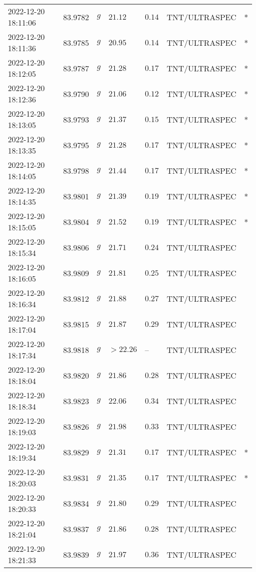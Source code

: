 \documentclass{nature_plusfigure}
\begin{document}
\begin{supplement}
\begin{center}
\begin{longtable}{lllllll}
2022-12-20 18:11:06 & 83.9782 & $g$ & $21.12$ & $0.14$ & TNT/ULTRASPEC & * \\ 
2022-12-20 18:11:36 & 83.9785 & $g$ & $20.95$ & $0.14$ & TNT/ULTRASPEC & * \\ 
2022-12-20 18:12:05 & 83.9787 & $g$ & $21.28$ & $0.17$ & TNT/ULTRASPEC & * \\ 
2022-12-20 18:12:36 & 83.9790 & $g$ & $21.06$ & $0.12$ & TNT/ULTRASPEC & * \\ 
2022-12-20 18:13:05 & 83.9793 & $g$ & $21.37$ & $0.15$ & TNT/ULTRASPEC & * \\ 
2022-12-20 18:13:35 & 83.9795 & $g$ & $21.28$ & $0.17$ & TNT/ULTRASPEC & * \\ 
2022-12-20 18:14:05 & 83.9798 & $g$ & $21.44$ & $0.17$ & TNT/ULTRASPEC & * \\ 
2022-12-20 18:14:35 & 83.9801 & $g$ & $21.39$ & $0.19$ & TNT/ULTRASPEC & * \\ 
2022-12-20 18:15:05 & 83.9804 & $g$ & $21.52$ & $0.19$ & TNT/ULTRASPEC & * \\ 
2022-12-20 18:15:34 & 83.9806 & $g$ & $21.71$ & $0.24$ & TNT/ULTRASPEC &  \\ 
2022-12-20 18:16:05 & 83.9809 & $g$ & $21.81$ & $0.25$ & TNT/ULTRASPEC &  \\ 
2022-12-20 18:16:34 & 83.9812 & $g$ & $21.88$ & $0.27$ & TNT/ULTRASPEC &  \\ 
2022-12-20 18:17:04 & 83.9815 & $g$ & $21.87$ & $0.29$ & TNT/ULTRASPEC &  \\ 
2022-12-20 18:17:34 & 83.9818 & $g$ & $>22.26$ & -- & TNT/ULTRASPEC &  \\ 
2022-12-20 18:18:04 & 83.9820 & $g$ & $21.86$ & $0.28$ & TNT/ULTRASPEC &  \\ 
2022-12-20 18:18:34 & 83.9823 & $g$ & $22.06$ & $0.34$ & TNT/ULTRASPEC &  \\ 
2022-12-20 18:19:03 & 83.9826 & $g$ & $21.98$ & $0.33$ & TNT/ULTRASPEC &  \\ 
2022-12-20 18:19:34 & 83.9829 & $g$ & $21.31$ & $0.17$ & TNT/ULTRASPEC & * \\ 
2022-12-20 18:20:03 & 83.9831 & $g$ & $21.35$ & $0.17$ & TNT/ULTRASPEC & * \\ 
2022-12-20 18:20:33 & 83.9834 & $g$ & $21.80$ & $0.29$ & TNT/ULTRASPEC &  \\ 
2022-12-20 18:21:04 & 83.9837 & $g$ & $21.86$ & $0.28$ & TNT/ULTRASPEC &  \\ 
2022-12-20 18:21:33 & 83.9839 & $g$ & $21.97$ & $0.36$ & TNT/ULTRASPEC &  \\ 

\end{longtable}
\end{center}
\end{supplement}
\end{document}
